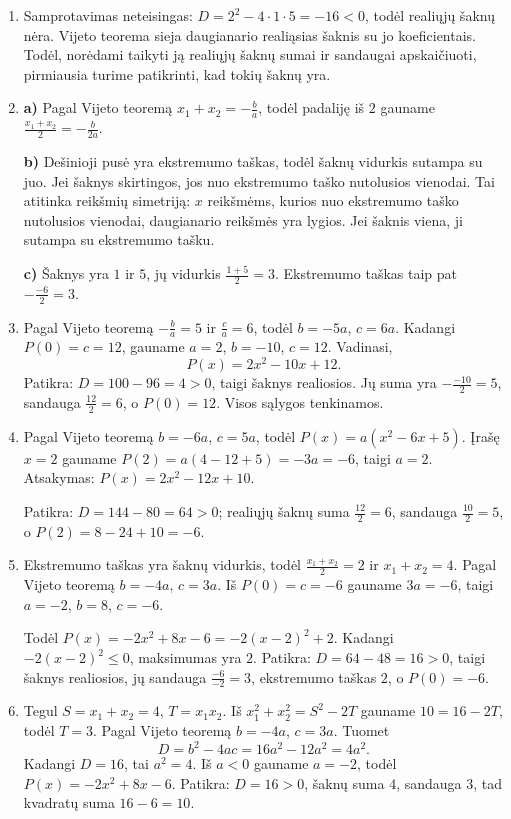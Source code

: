 \documentclass[12pt,a4paper]{article}
\begin{document}
\begin{enumerate}
\textbf{b)} Jei vienodo ženklo skaičių suma teigiama, abu teigiami; jei suma neigiama, abu neigiami.

\textbf{c)} Pirmojo suma $5$, sandauga $6$: abi šaknys teigiamos. Antrojo suma $-5$, sandauga $6$: abi neigiamos. Trečiojo sandauga $-\frac{3}{2}$: ženklai priešingi. Sąlygoje žinoma, kad šaknys realiosios ir skirtingos.
\item Samprotavimas neteisingas: $D=2^2-4\cdot1\cdot5=-16<0$, todėl realiųjų šaknų nėra. Vijeto teorema sieja daugianario realiąsias šaknis su jo koeficientais. Todėl, norėdami taikyti ją realiųjų šaknų sumai ir sandaugai apskaičiuoti, pirmiausia turime patikrinti, kad tokių šaknų yra.
\item \textbf{a)} Pagal Vijeto teoremą $x_1+x_2=-\frac{b}{a}$, todėl padaliję iš $2$ gauname $\frac{x_1+x_2}{2}=-\frac{b}{2a}$.

\textbf{b)} Dešinioji pusė yra ekstremumo taškas, todėl šaknų vidurkis sutampa su juo. Jei šaknys skirtingos, jos nuo ekstremumo taško nutolusios vienodai. Tai atitinka reikšmių simetriją: $x$ reikšmėms, kurios nuo ekstremumo taško nutolusios vienodai, daugianario reikšmės yra lygios. Jei šaknis viena, ji sutampa su ekstremumo tašku.

\textbf{c)} Šaknys yra $1$ ir $5$, jų vidurkis $\frac{1+5}{2}=3$. Ekstremumo taškas taip pat $-\frac{-6}{2}=3$.
\item Pagal Vijeto teoremą $-\frac{b}{a}=5$ ir $\frac{c}{a}=6$, todėl $b=-5a$, $c=6a$. Kadangi $P(0)=c=12$, gauname $a=2$, $b=-10$, $c=12$. Vadinasi,
\[P(x)=2x^2-10x+12.\]
Patikra: $D=100-96=4>0$, taigi šaknys realiosios. Jų suma yra $-\frac{-10}{2}=5$, sandauga $\frac{12}{2}=6$, o $P(0)=12$. Visos sąlygos tenkinamos.
\item Pagal Vijeto teoremą $b=-6a$, $c=5a$, todėl $P(x)=a(x^2-6x+5)$. Įrašę $x=2$ gauname $P(2)=a(4-12+5)=-3a=-6$, taigi $a=2$. Atsakymas: $P(x)=2x^2-12x+10$.

Patikra: $D=144-80=64>0$; realiųjų šaknų suma $\frac{12}{2}=6$, sandauga $\frac{10}{2}=5$, o $P(2)=8-24+10=-6$.
\item Ekstremumo taškas yra šaknų vidurkis, todėl $\frac{x_1+x_2}{2}=2$ ir $x_1+x_2=4$. Pagal Vijeto teoremą $b=-4a$, $c=3a$. Iš $P(0)=c=-6$ gauname $3a=-6$, taigi $a=-2$, $b=8$, $c=-6$.

Todėl $P(x)=-2x^2+8x-6=-2(x-2)^2+2$. Kadangi $-2(x-2)^2\leq0$, maksimumas yra $2$. Patikra: $D=64-48=16>0$, taigi šaknys realiosios, jų sandauga $\frac{-6}{-2}=3$, ekstremumo taškas $2$, o $P(0)=-6$.
\item Tegul $S=x_1+x_2=4$, $T=x_1x_2$. Iš $x_1^2+x_2^2=S^2-2T$ gauname $10=16-2T$, todėl $T=3$. Pagal Vijeto teoremą $b=-4a$, $c=3a$. Tuomet
\[D=b^2-4ac=16a^2-12a^2=4a^2.\]
Kadangi $D=16$, tai $a^2=4$. Iš $a<0$ gauname $a=-2$, todėl $P(x)=-2x^2+8x-6$. Patikra: $D=16>0$, šaknų suma $4$, sandauga $3$, tad kvadratų suma $16-6=10$.


\end{enumerate}
\end{document}
